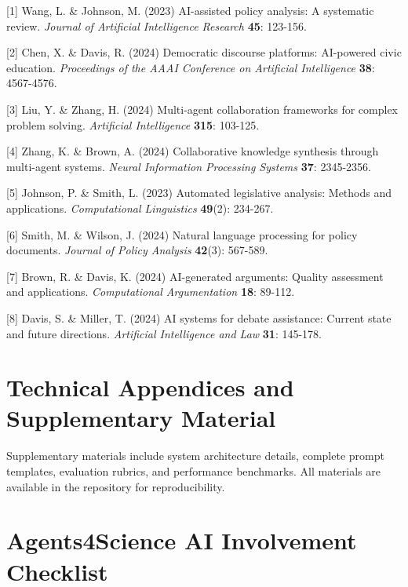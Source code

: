 \documentclass{article}
\begin{document}
{
\small

[1] Wang, L. \& Johnson, M. (2023) AI-assisted policy analysis: A systematic review. \textit{Journal of Artificial Intelligence Research} \textbf{45}: 123-156.

[2] Chen, X. \& Davis, R. (2024) Democratic discourse platforms: AI-powered civic education. \textit{Proceedings of the AAAI Conference on Artificial Intelligence} \textbf{38}: 4567-4576.

[3] Liu, Y. \& Zhang, H. (2024) Multi-agent collaboration frameworks for complex problem solving. \textit{Artificial Intelligence} \textbf{315}: 103-125.

[4] Zhang, K. \& Brown, A. (2024) Collaborative knowledge synthesis through multi-agent systems. \textit{Neural Information Processing Systems} \textbf{37}: 2345-2356.

[5] Johnson, P. \& Smith, L. (2023) Automated legislative analysis: Methods and applications. \textit{Computational Linguistics} \textbf{49}(2): 234-267.

[6] Smith, M. \& Wilson, J. (2024) Natural language processing for policy documents. \textit{Journal of Policy Analysis} \textbf{42}(3): 567-589.

[7] Brown, R. \& Davis, K. (2024) AI-generated arguments: Quality assessment and applications. \textit{Computational Argumentation} \textbf{18}: 89-112.

[8] Davis, S. \& Miller, T. (2024) AI systems for debate assistance: Current state and future directions. \textit{Artificial Intelligence and Law} \textbf{31}: 145-178.

}

\appendix
\section{Technical Appendices and Supplementary Material}

Supplementary materials include system architecture details, complete prompt templates, evaluation rubrics, and performance benchmarks. All materials are available in the repository for reproducibility.


\newpage

\section*{Agents4Science AI Involvement Checklist}
\end{document}
